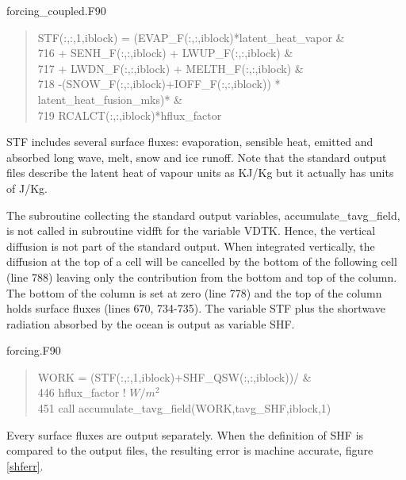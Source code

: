 \begin{center} forcing\_coupled.F90 \end{center}
\begin{quotation}
\small
\linespread{0.5}\selectfont{} \hspace{1em}     STF(:,:,1,iblock) = (EVAP\_F(:,:,iblock)*latent\_heat\_vapor             \&\\
716 \hspace{1em}                          + SENH\_F(:,:,iblock) + LWUP\_F(:,:,iblock)        \&\\
717 \hspace{1em}                          + LWDN\_F(:,:,iblock) + MELTH\_F(:,:,iblock)       \&\\
718 \hspace{1em}                          -(SNOW\_F(:,:,iblock)+IOFF\_F(:,:,iblock)) * latent\_heat\_fusion\_mks)*  \&\\
719 \hspace{1em}                            RCALCT(:,:,iblock)*hflux\_factor 
\end{quotation}
STF includes several surface fluxes: evaporation, sensible heat, emitted and absorbed long wave, melt, snow and ice runoff. Note that the standard output files describe the latent heat of vapour units as KJ/Kg but it actually has units of J/Kg.

The subroutine collecting the standard output variables, accumulate\_tavg\_field, is not called in subroutine vidfft for the variable VDTK. Hence, the vertical diffusion is not part of the standard output.  When integrated vertically, the diffusion at the top of a cell will be cancelled by the bottom of the following cell (line 788) leaving only the contribution from the bottom and top of the column. The bottom of the column is set at zero (line 778) and the top of the column holds surface fluxes (lines 670, 734-735). The variable STF plus the shortwave radiation absorbed by the ocean is output as variable SHF. 
\begin{center} forcing.F90 \end{center}
\begin{quotation}
\small
\linespread{0.5}\selectfont{} \hspace{1em}       WORK = (STF(:,:,1,iblock)+SHF\_QSW(:,:,iblock))/ \&\\
446 \hspace{1em}                  hflux\_factor ! $W/m^2$\\
451 \hspace{1em}        call accumulate\_tavg\_field(WORK,tavg\_SHF,iblock,1)\\
\end{quotation}
Every surface fluxes are output separately. When the definition of SHF is compared to the output files, the resulting error is machine accurate, figure \ref{shferr}. 

